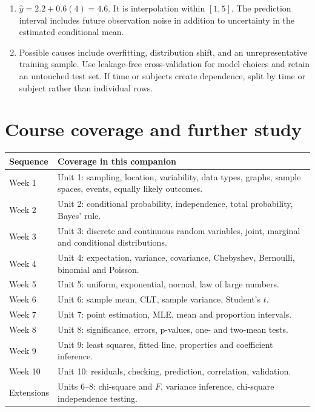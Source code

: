 \begin{enumerate}
are $(35,15)$ and $(35,15)$. Thus
$X^2=2(25/35+25/15)=100/21\approx4.7619$, $df=1$.
The upper-tail p-value is approximately 0.0291, without continuity correction.
\item $\hat y=2.2+0.6(4)=4.6$. It is interpolation within $[1,5]$.
The prediction interval includes future observation noise in addition to
uncertainty in the estimated conditional mean.
\item Possible causes include overfitting, distribution shift, and an
unrepresentative training sample. Use leakage-free cross-validation for
model choices and retain an untouched test set. If time or subjects create
dependence, split by time or subject rather than individual rows.
\end{enumerate}

\clearpage
\section{Course coverage and further study}
\begin{longtable}{p{}p{}}
\toprule
Sequence & Coverage in this companion\\\midrule
Week 1 & Unit 1: sampling, location, variability, data types,
graphs, sample spaces, events, equally likely outcomes.\\
Week 2 & Unit 2: conditional probability, independence, total probability,
Bayes' rule.\\
Week 3 & Unit 3: discrete and continuous random variables, joint,
marginal and conditional distributions.\\
Week 4 & Unit 4: expectation, variance, covariance, Chebyshev,
Bernoulli, binomial and Poisson.\\
Week 5 & Unit 5: uniform, exponential, normal, law of large numbers.\\
Week 6 & Unit 6: sample mean, CLT, sample variance, Student's $t$.\\
Week 7 & Unit 7: point estimation, MLE, mean and proportion intervals.\\
Week 8 & Unit 8: significance, errors, p-values, one- and two-mean tests.\\
Week 9 & Unit 9: least squares, fitted line, properties and coefficient inference.\\
Week 10 & Unit 10: residuals, checking, prediction, correlation, validation.\\
Extensions & Units 6--8: chi-square and $F$, variance inference,
chi-square independence testing.\\\bottomrule
\end{longtable}

